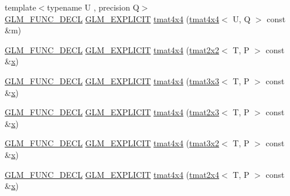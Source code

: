 \begin{DoxyCompactItemize}
\item 
{\footnotesize template$<$typename U , precision Q$>$ }\\\mbox{\hyperlink{setup_8hpp_ab2d052de21a70539923e9bcbf6e83a51}{G\+L\+M\+\_\+\+F\+U\+N\+C\+\_\+\+D\+E\+CL}} \mbox{\hyperlink{setup_8hpp_a6c74f5a5e7b134ab69023ff9a30d4d5d}{G\+L\+M\+\_\+\+E\+X\+P\+L\+I\+C\+IT}} \mbox{\hyperlink{structglm_1_1tmat4x4_ab23da6e5a57ab5834de4be100480b406}{tmat4x4}} (\mbox{\hyperlink{structglm_1_1tmat4x4}{tmat4x4}}$<$ U, Q $>$ const \&m)
\item 
\mbox{\hyperlink{setup_8hpp_ab2d052de21a70539923e9bcbf6e83a51}{G\+L\+M\+\_\+\+F\+U\+N\+C\+\_\+\+D\+E\+CL}} \mbox{\hyperlink{setup_8hpp_a6c74f5a5e7b134ab69023ff9a30d4d5d}{G\+L\+M\+\_\+\+E\+X\+P\+L\+I\+C\+IT}} \mbox{\hyperlink{structglm_1_1tmat4x4_ab8f61071f4bcaadf761d930e31ae2bbc}{tmat4x4}} (\mbox{\hyperlink{structglm_1_1tmat2x2}{tmat2x2}}$<$ T, P $>$ const \&\mbox{\hyperlink{glad_8h_a92d0386e5c19fb81ea88c9f99644ab1d}{x}})
\item 
\mbox{\hyperlink{setup_8hpp_ab2d052de21a70539923e9bcbf6e83a51}{G\+L\+M\+\_\+\+F\+U\+N\+C\+\_\+\+D\+E\+CL}} \mbox{\hyperlink{setup_8hpp_a6c74f5a5e7b134ab69023ff9a30d4d5d}{G\+L\+M\+\_\+\+E\+X\+P\+L\+I\+C\+IT}} \mbox{\hyperlink{structglm_1_1tmat4x4_a067e574eda5790e829f471ef564b3580}{tmat4x4}} (\mbox{\hyperlink{structglm_1_1tmat3x3}{tmat3x3}}$<$ T, P $>$ const \&\mbox{\hyperlink{glad_8h_a92d0386e5c19fb81ea88c9f99644ab1d}{x}})
\item 
\mbox{\hyperlink{setup_8hpp_ab2d052de21a70539923e9bcbf6e83a51}{G\+L\+M\+\_\+\+F\+U\+N\+C\+\_\+\+D\+E\+CL}} \mbox{\hyperlink{setup_8hpp_a6c74f5a5e7b134ab69023ff9a30d4d5d}{G\+L\+M\+\_\+\+E\+X\+P\+L\+I\+C\+IT}} \mbox{\hyperlink{structglm_1_1tmat4x4_a966a90852a10e3214df58a8823260cb1}{tmat4x4}} (\mbox{\hyperlink{structglm_1_1tmat2x3}{tmat2x3}}$<$ T, P $>$ const \&\mbox{\hyperlink{glad_8h_a92d0386e5c19fb81ea88c9f99644ab1d}{x}})
\item 
\mbox{\hyperlink{setup_8hpp_ab2d052de21a70539923e9bcbf6e83a51}{G\+L\+M\+\_\+\+F\+U\+N\+C\+\_\+\+D\+E\+CL}} \mbox{\hyperlink{setup_8hpp_a6c74f5a5e7b134ab69023ff9a30d4d5d}{G\+L\+M\+\_\+\+E\+X\+P\+L\+I\+C\+IT}} \mbox{\hyperlink{structglm_1_1tmat4x4_aebc9c223de2814546e636fa023185bcb}{tmat4x4}} (\mbox{\hyperlink{structglm_1_1tmat3x2}{tmat3x2}}$<$ T, P $>$ const \&\mbox{\hyperlink{glad_8h_a92d0386e5c19fb81ea88c9f99644ab1d}{x}})
\item 
\mbox{\hyperlink{setup_8hpp_ab2d052de21a70539923e9bcbf6e83a51}{G\+L\+M\+\_\+\+F\+U\+N\+C\+\_\+\+D\+E\+CL}} \mbox{\hyperlink{setup_8hpp_a6c74f5a5e7b134ab69023ff9a30d4d5d}{G\+L\+M\+\_\+\+E\+X\+P\+L\+I\+C\+IT}} \mbox{\hyperlink{structglm_1_1tmat4x4_a2bbdcb0143f39ec4fe8319cc6ceaedd5}{tmat4x4}} (\mbox{\hyperlink{structglm_1_1tmat2x4}{tmat2x4}}$<$ T, P $>$ const \&\mbox{\hyperlink{glad_8h_a92d0386e5c19fb81ea88c9f99644ab1d}{x}})

\end{DoxyCompactItemize}
